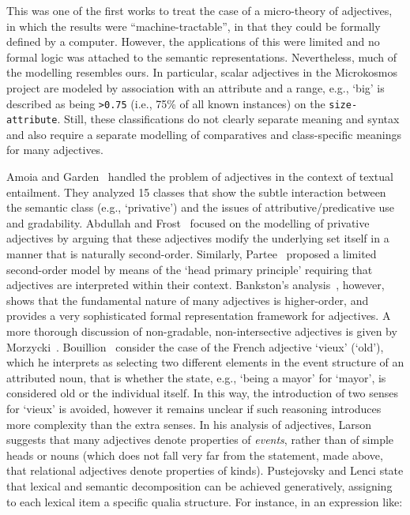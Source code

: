 \documentclass[11pt]{article}
\begin{document}
This was one of the first works to treat the case of a micro-theory of adjectives, in which the results were ``machine-tractable'', in that they could be formally defined by a computer. However, the applications of this were limited and no formal logic was attached to the semantic representations. Nevertheless, much of the modelling resembles ours. In particular, scalar adjectives in the Microkosmos project are modeled by association with an attribute and a range, e.g., `big' is described as being {\tt >0.75} (i.e., 75\% of all known instances) on the {\tt size-attribute}. Still, these classifications do not clearly separate meaning and syntax and also require a separate modelling of comparatives and class-specific meanings for many adjectives.

Amoia and Garden~ handled the problem of adjectives in the context of textual entailment. They analyzed 15 classes that show the subtle interaction between the semantic class (e.g., `privative') and the issues of attributive/predicative use and gradability.  
Abdullah and Frost~ focused on the modelling of privative adjectives by arguing that these adjectives modify the underlying set itself in a manner that is naturally second-order. Similarly, Partee~ proposed a limited second-order model by means of the `head primary principle' requiring that adjectives are interpreted within their context. %
Bankston's analysis~, however, shows that the fundamental nature of many adjectives is higher-order, and provides a very sophisticated formal representation framework for adjectives. A more thorough discussion of non-gradable, non-intersective adjectives is given by Morzycki~.
Bouillion~ consider the case of the French adjective `vieux' (`old'), which he interprets as selecting two different
elements in the event structure of an attributed noun, that is whether the
state, e.g., `being a mayor' for `mayor', is considered old or the individual
itself. In this way, the introduction of two senses for `vieux' is avoided, 
however it remains unclear if such reasoning introduces more complexity than
the extra senses. %
In his analysis of adjectives, Larson  suggests that many adjectives denote properties of \textit{events}, rather than of simple heads or nouns (which does not fall very far from the statement, made above, that relational adjectives denote properties of kinds). Pustejovsky  and Lenci  state that lexical and semantic decomposition can be achieved generatively, assigning to each lexical item a specific qualia structure. For instance, in an expression like:
\end{document}
